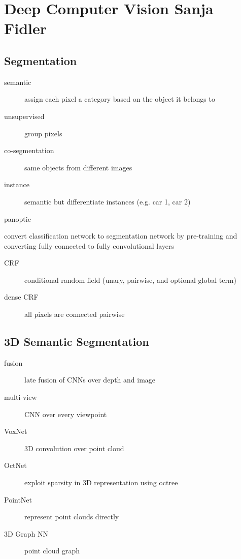 \documentclass[]{article}
\theoremstyle{definition}
\begin{document}
    \section{Deep Computer Vision {\small Sanja Fidler}}%
    \label{sec:deep_computer_vision}

    \subsection{Segmentation}%
    \label{sub:segmentation}

    \begin{description}
        \item[semantic] assign each pixel a category based on the object it belongs to
        \item[unsupervised] group pixels
        \item[co-segmentation] same objects from different images
        \item[instance] semantic but differentiate instances (e.g. car 1, car 2)
        \item[panoptic]
    \end{description}

    convert classification network to segmentation network by pre-training and converting fully connected to fully convolutional layers

    \begin{description}
        \item[CRF] conditional random field (unary, pairwise, and optional global term)
        \item[dense CRF] all pixels are connected pairwise
    \end{description}

    \subsection{3D Semantic Segmentation}%
    \label{sub:3d_semantic_segmentation}
    \begin{description}
        \item[fusion] late fusion of CNNs over depth and image
        \item[multi-view] CNN over every viewpoint
        \item[VoxNet] 3D convolution over point cloud
        \item[OctNet] exploit sparsity in 3D representation using octree
        \item[PointNet] represent point clouds directly
        \item[3D Graph NN] point cloud graph
    \end{description}
\end{document}
